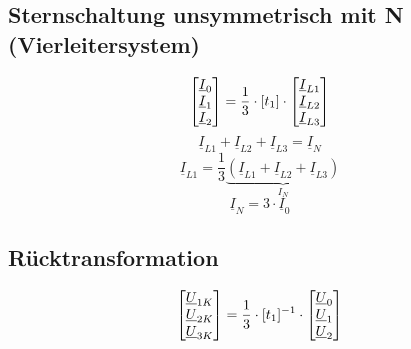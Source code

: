 \documentclass[a4,paper,fleqn]{article}
\begin{document}
\subsection{Sternschaltung unsymmetrisch mit N (Vierleitersystem)}
\[
\left\lbrack
    \begin{array}{@{}l@{}}
        \underline{I}_{0} \\
        \underline{I}_{1} \\
        \underline{I}_{2} \\
    \end{array}
\right\rbrack
=
\frac{1}{3} \cdot
\lbrack t_1 \rbrack
\cdot
\left\lbrack
    \begin{array}{@{}l@{}}
        \underline{I}_{L1} \\
        \underline{I}_{L2} \\
        \underline{I}_{L3} \\
    \end{array}
\right\rbrack
\]
\[ \underline{I}_{L1} + \underline{I}_{L2} + \underline{I}_{L3} = \underline{I}_{N} \]
\[ \underline{I}_{L1} = \frac{1}{3} \underbrace{(\underline{I}_{L1} + \underline{I}_{L2} + \underline{I}_{L3})}_{I_N} \]
\[ \boxed{\underline{I}_{N} = 3 \cdot \underline{I}_{0}} \]

\subsection{Rücktransformation}
\[
\left\lbrack
    \begin{array}{@{}l@{}}
        \underline{U}_{1K} \\
        \underline{U}_{2K} \\
        \underline{U}_{3K} \\
    \end{array}
\right\rbrack
=
\frac{1}{3} \cdot
\lbrack t_1 \rbrack^{-1}
\cdot
\left\lbrack
    \begin{array}{@{}l@{}}
        \underline{U}_{0} \\
        \underline{U}_{1} \\
        \underline{U}_{2} \\
    \end{array}
\right\rbrack
\]
\end{document}
